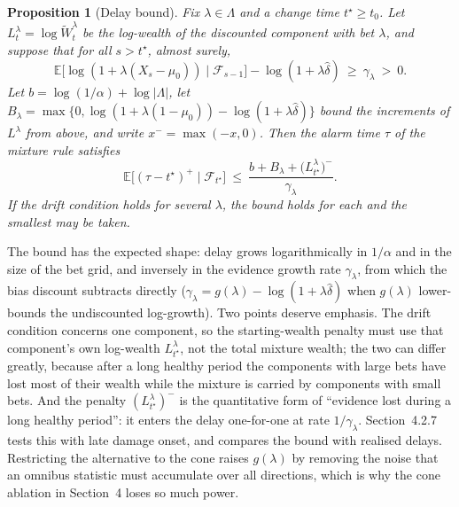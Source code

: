 \documentclass[12pt,a4paper]{article}
\newenvironment{revblock}{}{}
\newenvironment{revblock}{\begingroup\color{revcol}}{\endgroup}
\newtheorem{proposition}{Proposition}
\newcommand{\E}{\mathbb{E}}
\newcommand{\F}{\mathcal{F}}
\begin{document}
\begin{proposition}[Delay bound]\label{prop:delay}
\begin{revblock}
Fix $\lambda\in\Lambda$ and a change time $t^\star\ge t_0$. Let $L^\lambda_t=\log\widetilde W^\lambda_t$ be the log-wealth of the discounted component with bet $\lambda$, and suppose that for all $s>t^\star$, almost surely,
\[
\E\big[\log(1+\lambda(X_s-\mu_0))\mid\F_{s-1}\big]-\log(1+\lambda\hat\delta)\ \ge\ \gamma_\lambda\ >\ 0 .
\]
Let $b=\log(1/\alpha)+\log|\Lambda|$, let $B_\lambda=\max\{0,\log(1+\lambda(1-\mu_0))-\log(1+\lambda\hat\delta)\}$ bound the increments of $L^\lambda$ from above, and write $x^-=\max(-x,0)$. Then the alarm time $\tau$ of the mixture rule satisfies
\begin{equation}
\E\big[(\tau-t^\star)^{+}\mid\F_{t^\star}\big]\ \le\ \frac{b+B_\lambda+\big(L^\lambda_{t^\star}\big)^{-}}{\gamma_\lambda}.
\label{eq:delay}
\end{equation}
If the drift condition holds for several $\lambda$, the bound holds for each and the smallest may be taken.
\end{revblock}
\end{proposition}

\begin{revblock}
The bound has the expected shape: delay grows logarithmically in $1/\alpha$ and in the size of the bet grid, and inversely in the evidence growth rate $\gamma_\lambda$, from which the bias discount subtracts directly ($\gamma_\lambda=g(\lambda)-\log(1+\lambda\hat\delta)$ when $g(\lambda)$ lower-bounds the undiscounted log-growth). Two points deserve emphasis. The drift condition concerns one component, so the starting-wealth penalty must use that component's own log-wealth $L^\lambda_{t^\star}$, not the total mixture wealth; the two can differ greatly, because after a long healthy period the components with large bets have lost most of their wealth while the mixture is carried by components with small bets. And the penalty $(L^\lambda_{t^\star})^-$ is the quantitative form of ``evidence lost during a long healthy period'': it enters the delay one-for-one at rate $1/\gamma_\lambda$. Section~4.2.7 tests this with late damage onset, and compares the bound with realised delays.
\end{revblock}
Restricting the alternative to the cone raises $g(\lambda)$ by removing the noise that an omnibus statistic must accumulate over all directions, which is why the cone ablation in Section~4 loses so much power.
\end{document}
